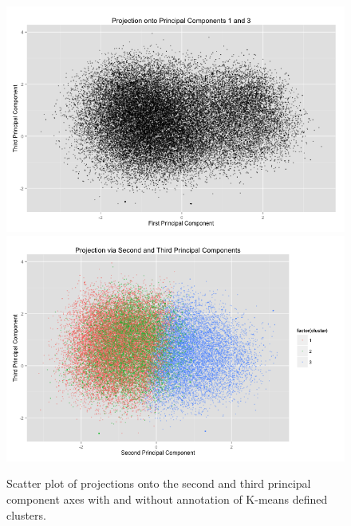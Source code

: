 \documentclass[english]{article}\usepackage{graphicx, color}
\numberwithin{equation}{section}
\numberwithin{figure}{section}
\begin{document}
\begin{figure}
\begin{center}
\includegraphics[scale = .3]{PCA23bw.png}
\includegraphics[scale = .3]{PCA23c.png}
\end{center}
\caption{Scatter plot of projections onto the second and third principal component axes with and without annotation of K-means defined clusters.}
\end{figure}
\end{document}
